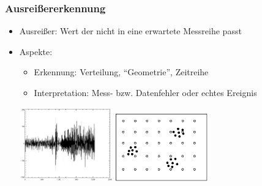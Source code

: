     
    \begin{frame}
    \frametitle{Ausreißererkennung}
    
    \begin{itemize}
    \item Ausreißer: Wert der nicht in eine erwartete Messreihe passt
    \item Aspekte:
    \begin{itemize}
    \item Erkennung: Verteilung, "`Geometrie"', Zeitreihe
    \item Interpretation: Mess- bzw. Datenfehler oder echtes Ereignis
    \end{itemize}
    \begin{center}
    \includegraphics[width=4cm]{fig4/noise2.png}\quad
    \includegraphics[width=4cm]{fig4/noise1.pdf}
    \end{center}
    \end{itemize}
    
    \end{frame}
    
    
